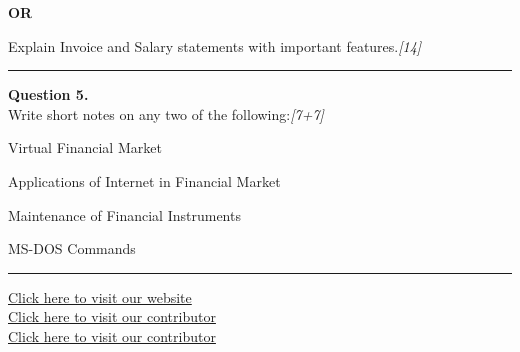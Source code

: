 \documentclass[11pt,a4paper]{article}
\newcommand{\pts}[1]{\hfill   \textit{[#1]}}
\begin{document}
\centerline{   \textbf{OR}}

Explain Invoice and Salary statements with important features.\pts{14}

\medskip\rule{\linewidth}{0.2pt}




\noindent   \textbf{Question 5.} \\
Write short notes on any two of the following:\pts{7+7}

\begin{parts}
  \item Virtual Financial Market
  \item Applications of Internet in Financial Market
  \item Maintenance of Financial Instruments
  \item MS-DOS Commands
\end{parts}

\vfill
\rule{\linewidth}{0.4pt}

\begin{center}\small
  \href{https://bhu-exam.vercel.app/}{Click here to visit our website}\\[4pt]
  \href{https://me-aryan.vercel.app/}{Click here to visit our contributor}\\[4pt]
  \href{https://quashan-me.vercel.app/}{Click here to visit our contributor}
\end{center}
\end{document}

